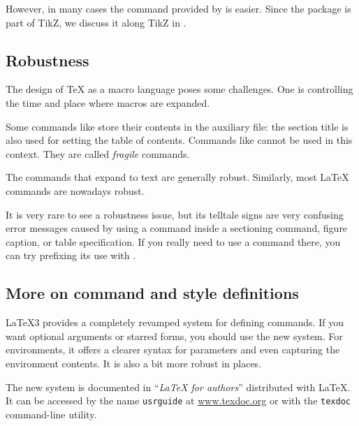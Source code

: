 However, in many cases the  command provided by  is easier.
Since the  package is part of TikZ,
we discuss it along TikZ in .


%
%
\subsection{Robustness}\label{sec:robustness}

The design of \TeX{} as a macro language poses some challenges.
One is controlling the time and place where macros are expanded.

Some commands like  store their contents in the auxiliary file:
the section title is also used for setting the table of contents.
Commands like  cannot be used in this context.
They are called \emph{fragile} commands.

The commands that expand to text are generally robust.
Similarly, most \LaTeX{} commands are nowadays robust.

It is very rare to see a robustness issue,
but its telltale signs are very confusing error messages
caused by using a command inside a sectioning command, figure caption, or table specification.
If you really need to use a command there,
you can try prefixing its use with .


%
%
\subsection{More on command and style definitions}\label{sec:latex3 commands}

\LaTeX3 provides a completely revamped system for defining commands.
If you want optional arguments or starred forms,
you should use the new system.
For environments, it offers a clearer syntax for parameters
and even capturing the environment contents.
It is also a bit more robust in places.

The new system is documented in ``\emph{\LaTeX{} for authors}'' distributed with \LaTeX.
It can be accessed by the name \texttt{usrguide} at \url{www.texdoc.org}
or with the \verb|texdoc| command-line utility.


